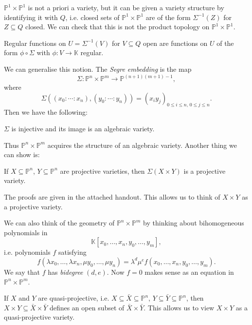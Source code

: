 \documentclass[12pt]{article}
\begin{document}
\begin{remark}
	$\mathbb{P}^1 \times \mathbb{P}^1$ is not a priori a variety, but it can be given a variety structure by identifying it with $Q$, i.e. closed sets of $\mathbb{P}^1 \times \mathbb{P}^1$ are of the form $\Sigma^{-1}(Z)$ for $Z \subseteq Q$ closed. We can check that this is not the product topology on $\mathbb{P}^1 \times \mathbb{P}^1$.

	Regular functions on $U = \Sigma^{-1}(V)$ for $V \subseteq Q$ open are functions on $U$ of the form $\phi \circ \Sigma$ with $\phi : V \to \mathbb{K}$ regular.
\end{remark}

We can generalise this notion. The \emph{Segre embedding} is the map
\[
\Sigma : \mathbb{P}^n \times \mathbb{P}^m \to \mathbb{P}^{(n+1)(m+1)-1},
\]
where
\[
	\Sigma((x_0 : \cdots : x_n), (y_0 :  \cdots : y_n)) = (x_i y_j)_{0 \leq i \leq n,\, 0 \leq j \leq n}.
\]
Then we have the following:
\begin{theorem}
	$\Sigma$ is injective and its image is an algebraic variety.
\end{theorem}

Thus $\mathbb{P}^n \times \mathbb{P}^m$ acquires the structure of an algebraic variety. Another thing we can show is:
\begin{theorem}
	If $X \subseteq \mathbb{P}^n$, $Y \subseteq \mathbb{P}^n$ are projective varieties, then $\Sigma(X \times Y)$ is a projective variety.
\end{theorem}
The proofs are given in the attached handout. This allows us to think of $X \times Y$ as a projective variety.

We can also think of the geometry of $\mathbb{P}^n \times \mathbb{P}^m$ by thinking about bihomogeneous polynomials in
\[
	\mathbb{K}[x_0, \ldots, x_n, y_0, \ldots, y_m],
\]
i.e. polynomials $f$ satisfying
\[
f(\lambda x_0, \ldots, \lambda x_n, \mu y_0, \ldots, \mu y_n) = \lambda^d \mu^e f(x_0, \ldots, x_n, y_0, \ldots, y_m).
\]
We say that $f$ has \emph{bidegree} $(d, e)$. Now $f = 0$ makes sense as an equation in $\mathbb{P}^n \times \mathbb{P}^m$.

If $X$ and $Y$ are quasi-projective, i.e. $X \subseteq \bar X \subseteq \mathbb{P}^n$, $Y \subseteq \bar Y \subseteq \mathbb{P}^n$, then $X \times Y \subseteq \bar X \times \bar Y$ defines an open subset of $\bar X \times \bar Y$. This allows us to view $X \times Y$ as a quasi-projective variety.
\end{document}
